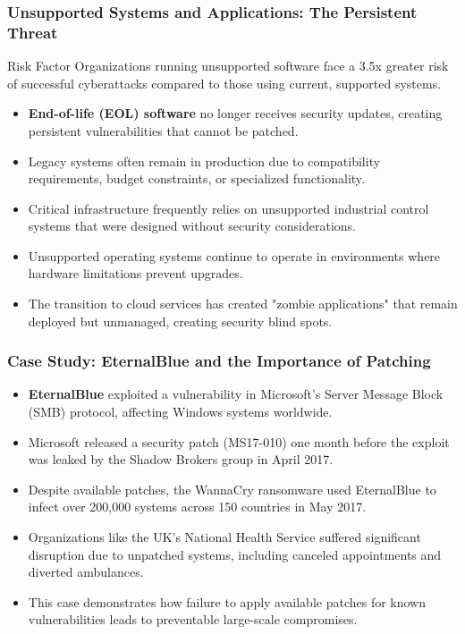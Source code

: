 \documentclass{beamer}
\begin{document}
\begin{frame}
    \frametitle{Unsupported Systems and Applications: The Persistent Threat}
    
    \begin{alertblock}{Risk Factor}
        Organizations running unsupported software face a 3.5x greater risk of successful cyberattacks compared to those using current, supported systems.
    \end{alertblock}
    
    \begin{itemize}
        \item \textbf{End-of-life (EOL) software} no longer receives security updates, creating persistent vulnerabilities that cannot be patched.
        \item Legacy systems often remain in production due to compatibility requirements, budget constraints, or specialized functionality.
        \item Critical infrastructure frequently relies on unsupported industrial control systems that were designed without security considerations.
        \item Unsupported operating systems continue to operate in environments where hardware limitations prevent upgrades.
        \item The transition to cloud services has created "zombie applications" that remain deployed but unmanaged, creating security blind spots.
    \end{itemize}
\end{frame}

\begin{frame}
    \frametitle{Case Study: EternalBlue and the Importance of Patching}
    
    \begin{itemize}
        \item \textbf{EternalBlue} exploited a vulnerability in Microsoft's Server Message Block (SMB) protocol, affecting Windows systems worldwide.
        \item Microsoft released a security patch (MS17-010) one month before the exploit was leaked by the Shadow Brokers group in April 2017.
        \item Despite available patches, the WannaCry ransomware used EternalBlue to infect over 200,000 systems across 150 countries in May 2017.
        \item Organizations like the UK's National Health Service suffered significant disruption due to unpatched systems, including canceled appointments and diverted ambulances.
        \item This case demonstrates how failure to apply available patches for known vulnerabilities leads to preventable large-scale compromises.
    \end{itemize}
\end{frame}
\end{document}
